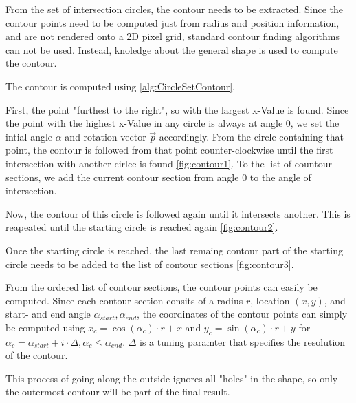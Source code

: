 From the set of intersection circles, the contour needs to be extracted. 
Since the contour points need to be computed just from radius and position information, and are not rendered onto a 2D pixel grid, standard contour finding algorithms can not be used.
Instead, knoledge about the general shape is used to compute the contour. 

The contour is computed using \autoref{alg:CircleSetContour}.

First, the point "furthest to the right", so with the largest x-Value is found. 
Since the point with the highest x-Value in any circle is always at angle 0, we set the intial angle $\alpha$ and rotation vector $\vec{p}$ accordingly.
From the circle containing that point, the contour is followed from that point counter-clockwise until the first intersection with another cirlce is found \autoref{fig:contour1}.
To the list of countour sections, we add the current contour section from angle 0 to the angle of intersection.

Now, the contour of this circle is followed again until it intersects another. This is reapeated until the starting circle is reached again \autoref{fig:contour2}.

Once the starting circle is reached, the last remaing contour part of the starting circle needs to be added to the list of contour sections \autoref{fig:contour3}.

From the ordered list of contour sections, the contour points can easily be computed.
Since each contour section consits of a radius $r$, location $(x,y)$, and start- and end angle $\alpha_{start}, \alpha_{end}$, the coordinates of the contour points can simply be computed using $x_c = \cos(\alpha_c) \cdot r + x$ and  $y_c = \sin(\alpha_c) \cdot r + y$ 
for $\alpha_c = \alpha_{start} + i \cdot \Delta, \alpha_c \leq \alpha_{end}$.
$\Delta$ is a tuning paramter that specifies the resolution of the contour.

This process of going along the outside ignores all "holes" in the shape, so only the outermost contour will be part of the final result.



